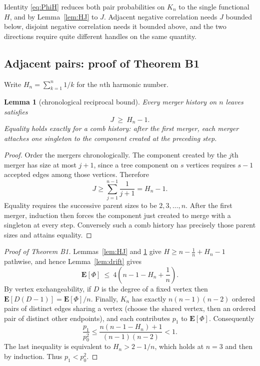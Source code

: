 \documentclass[10pt,a4paper]{amsart}
\newtheorem{lemma}[theorem]{Lemma}
\newcommand{\E}{\mathbf{E}}
\begin{document}
Identity \eqref{eq:PhiH} reduces both pair probabilities on $K_n$ to the single
functional $H$, and by Lemma~\ref{lem:HJ} to $J$. Adjacent negative correlation
needs $J$ bounded below, disjoint negative correlation needs it bounded above,
and the two directions require quite different handles on the same quantity.

\subsection{Adjacent pairs: proof of Theorem B1}

Write $H_n=\sum_{k=1}^n1/k$ for the $n$th harmonic number.

\begin{lemma}[chronological reciprocal bound]
\label{lem:harmonic}
Every merger history on $n$ leaves satisfies
\begin{equation}
\label{eq:Jlower}
J\ \ge\ H_n-1.
\end{equation}
Equality holds exactly for a comb history: after the first merger, each merger
attaches one singleton to the component created at the preceding step.
\end{lemma}

\begin{proof}
Order the mergers chronologically. The component created by the $j$th merger
has size at most $j+1$, since a tree component on $s$ vertices requires $s-1$
accepted edges among those vertices. Therefore
\[
J\ge\sum_{j=1}^{n-1}\frac1{j+1}=H_n-1.
\]
Equality requires the successive parent sizes to be $2,3,\ldots,n$. After the
first merger, induction then forces the component just created to merge with a
singleton at every step. Conversely such a comb history has precisely those
parent sizes and attains equality.
\end{proof}

\begin{proof}[Proof of Theorem B1]
Lemmas~\ref{lem:HJ} and \ref{lem:harmonic} give
$H\ge n-\frac1n+H_n-1$ pathwise, and hence Lemma~\ref{lem:drift} gives
\begin{equation}
\label{eq:Phiupper}
\E[\Phi]\ \le\ 4\left(n-1-H_n+\frac1n\right).
\end{equation}
By vertex exchangeability, if $D$ is the degree of a fixed vertex then
$\E[D(D-1)]=\E[\Phi]/n$. Finally, $K_n$ has exactly $n(n-1)(n-2)$
ordered pairs of distinct edges sharing a vertex (choose the shared vertex, then
an ordered pair of distinct other endpoints), and each contributes $p_1$ to
$\E[\Phi]$. Consequently
\[
\frac{p_1}{p_0^2}
\le \frac{n(n-1-H_n)+1}{(n-1)(n-2)}<1.
\]
The last inequality is equivalent to $H_n>2-1/n$, which holds at $n=3$ and
then by induction. Thus $p_1<p_0^2$. \qedhere
\end{proof}
\end{document}
